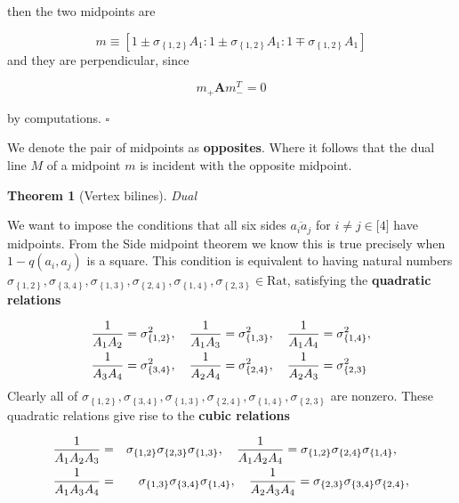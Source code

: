 \documentclass[11pt]{article}
\newtheorem{theorem}{Theorem}
\begin{document}
then the two midpoints are

\begin{equation*}
m\equiv \left[ 1\pm \sigma _{\left\{ 1,2\right\} }A_{1}:1\pm \sigma
_{\left\{ 1,2\right\} }A_{1}:1\mp \sigma _{\left\{ 1,2\right\} }A_{1}\right]
\end{equation*}
and they are perpendicular, since

\begin{equation*}
m_{+}\mathbf{A}m_{-}^{T}=0
\end{equation*}

\bigskip by computations. $\square $

We denote the pair of midpoints as \textbf{opposites}. Where it follows that
the dual line $M$ of a midpoint $m$ is incident with the opposite midpoint.

\begin{theorem}[Vertex bilines]
Dual
\end{theorem}

We want to impose the conditions that all six sides $\overline{a_{i}a_{j}}$
for $i\neq j\in \lbrack 4]$ have midpoints. From the Side midpoint theorem
we know this is true precisely when $1-q(a_{i},a_{j})$ is a square. This
condition is equivalent to having natural numbers $\sigma _{\left\{
1,2\right\} },\sigma _{\left\{ 3,4\right\} },\sigma _{\left\{ 1,3\right\}
},\sigma _{\left\{ 2,4\right\} },\sigma _{\left\{ 1,4\right\} },\sigma
_{\left\{ 2,3\right\} }\in \text{Rat}$, satisfying the \textbf{quadratic
relations}

\begin{align}
\frac{1}{A_{1}A_{2}}& =\sigma _{\left\{ 1,2\right\} }^{2},\quad \frac{1}{%
A_{1}A_{3}}=\sigma _{\left\{ 1,3\right\} }^{2},\quad \frac{1}{A_{1}A_{4}}%
=\sigma _{\left\{ 1,4\right\} }^{2},  \label{Quadratic Relations} \\
\frac{1}{A_{3}A_{4}}& =\sigma _{\left\{ 3,4\right\} }^{2},\quad \frac{1}{%
A_{2}A_{4}}=\sigma _{\left\{ 2,4\right\} }^{2},\quad \frac{1}{A_{2}A_{3}}%
=\sigma _{\left\{ 2,3\right\} }^{2}
\end{align}%
\qquad Clearly all of $\sigma _{\left\{ 1,2\right\} },\sigma _{\left\{
3,4\right\} },\sigma _{\left\{ 1,3\right\} },\sigma _{\left\{ 2,4\right\}
},\sigma _{\left\{ 1,4\right\} },\sigma _{\left\{ 2,3\right\} }$ are
nonzero. These quadratic relations give rise to the \textbf{cubic relations}

\begin{eqnarray}
\frac{1}{A_{1}A_{2}A_{3}} &=&\sigma _{\left\{ 1,2\right\} }\sigma _{\left\{
2,3\right\} }\sigma _{\left\{ 1,3\right\} },\quad \frac{1}{A_{1}A_{2}A_{4}}%
=\sigma _{\left\{ 1,2\right\} }\sigma _{\left\{ 2,4\right\} }\sigma
_{\left\{ 1,4\right\} },\quad  \label{Cubic Relations} \\
\frac{1}{A_{1}A_{3}A_{4}} &=&\sigma _{\left\{ 1,3\right\} }\sigma _{\left\{
3,4\right\} }\sigma _{\left\{ 1,4\right\} },\quad \frac{1}{A_{2}A_{3}A_{4}}%
=\sigma _{\left\{ 2,3\right\} }\sigma _{\left\{ 3,4\right\} }\sigma
_{\left\{ 2,4\right\} },  \notag
\end{eqnarray}
\end{document}
